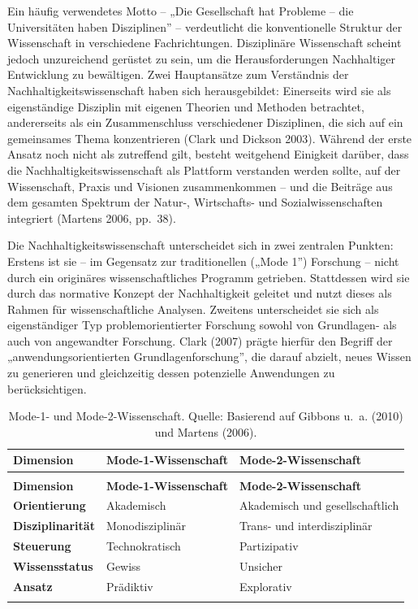 \documentclass[
  nswissgerman,
  a4paper,
  openany]{book}
\begin{document}
Ein häufig verwendetes Motto -- „Die Gesellschaft hat Probleme -- die
Universitäten haben Disziplinen'' -- verdeutlicht die konventionelle
Struktur der Wissenschaft in verschiedene Fachrichtungen. Disziplinäre
Wissenschaft scheint jedoch unzureichend gerüstet zu sein, um die
Herausforderungen Nachhaltiger Entwicklung zu bewältigen. Zwei
Hauptansätze zum Verständnis der Nachhaltigkeitswissenschaft haben sich
herausgebildet: Einerseits wird sie als eigenständige Disziplin mit
eigenen Theorien und Methoden betrachtet, andererseits als ein
Zusammenschluss verschiedener Disziplinen, die sich auf ein gemeinsames
Thema konzentrieren (Clark und Dickson 2003). Während der erste Ansatz
noch nicht als zutreffend gilt, besteht weitgehend Einigkeit darüber,
dass die Nachhaltigkeitswissenschaft als Plattform verstanden werden
sollte, auf der Wissenschaft, Praxis und Visionen zusammenkommen -- und
die Beiträge aus dem gesamten Spektrum der Natur-, Wirtschafts- und
Sozialwissenschaften integriert (Martens 2006, pp.~38).

Die Nachhaltigkeitswissenschaft unterscheidet sich in zwei zentralen
Punkten: Erstens ist sie -- im Gegensatz zur traditionellen („Mode 1'')
Forschung -- nicht durch ein originäres wissenschaftliches Programm
getrieben. Stattdessen wird sie durch das normative Konzept der
Nachhaltigkeit geleitet und nutzt dieses als Rahmen für
wissenschaftliche Analysen. Zweitens unterscheidet sie sich als
eigenständiger Typ problemorientierter Forschung sowohl von Grundlagen-
als auch von angewandter Forschung. Clark (2007) prägte hierfür den
Begriff der „anwendungsorientierten Grundlagenforschung'', die darauf
abzielt, neues Wissen zu generieren und gleichzeitig dessen potenzielle
Anwendungen zu berücksichtigen.

\begingroup\fontsize{8}{10}\selectfont

\begin{longtable}[t]{>{\raggedright\arraybackslash}p{4.5cm}>{\raggedright\arraybackslash}p{4.5cm}l}

\caption{\label{tbl-mode1-mode2-science}Mode-1- und Mode-2-Wissenschaft.
Quelle: Basierend auf Gibbons u.~a. (2010) und Martens (2006).}

\tabularnewline

\toprule
\textbf{Dimension} & \textbf{Mode-1-Wissenschaft} & \textbf{Mode-2-Wissenschaft}\\
\midrule
\endfirsthead
\multicolumn{3}{@{}l}{\textit{(continued)}}\\
\toprule
\textbf{Dimension} & \textbf{Mode-1-Wissenschaft} & \textbf{Mode-2-Wissenschaft}\\
\midrule
\endhead

\endfoot
\bottomrule
\endlastfoot
\textbf{Orientierung} & Akademisch & Akademisch und gesellschaftlich\\
\textbf{Disziplinarität} & Monodisziplinär & Trans- und interdisziplinär\\
\textbf{Steuerung} & Technokratisch & Partizipativ\\
\textbf{Wissensstatus} & Gewiss & Unsicher\\
\textbf{Ansatz} & Prädiktiv & Explorativ\\*

\end{longtable}
\end{document}
